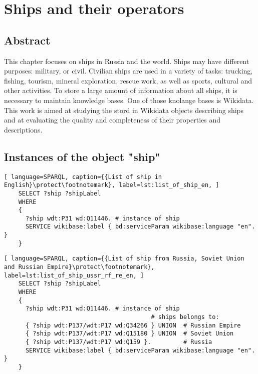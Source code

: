 \setchapterpreamble[u]{\margintoc}
\chapter{Ships and their operators}


\section{Abstract}

This chapter focuses on ships in Russia and the world. Ships may have different purposes: military, or civil. Civilian ships are used in a variety of tasks: trucking, fishing, tourism, mineral exploration, rescue work, as well as sports, cultural and other activities. To store a large amount of information about all ships, it is necessary to maintain knowledge bases. One of those knolange bases is Wikidata. This work is aimed at studying the stord in Wikidata objects describing ships and at evaluating the quality and completeness of their properties and descriptions.


\section{Instances of the object "ship"}


\begin{lstlisting}[ language=SPARQL, caption={{List of ship in English}\protect\footnotemark}, label=lst:list_of_ship_en, ]
    SELECT ?ship ?shipLabel
    WHERE
    {
      ?ship wdt:P31 wd:Q11446. # instance of ship
      SERVICE wikibase:label { bd:serviceParam wikibase:language "en". }
    }
  \end{lstlisting}

  
\begin{lstlisting}[ language=SPARQL, caption={{List of ship from Russia, Soviet Union and Russian Empire}\protect\footnotemark}, label=lst:list_of_ship_ussr_rf_re_en, ]
    SELECT ?ship ?shipLabel
    WHERE
    {
      ?ship wdt:P31 wd:Q11446. # instance of ship
                                         # ships belongs to:
      { ?ship wdt:P137/wdt:P17 wd:Q34266 } UNION  # Russian Empire
      { ?ship wdt:P137/wdt:P17 wd:Q15180 } UNION  # Soviet Union
      { ?ship wdt:P137/wdt:P17 wd:Q159 }.         # Russia
      SERVICE wikibase:label { bd:serviceParam wikibase:language "en". }
    }
  \end{lstlisting}

